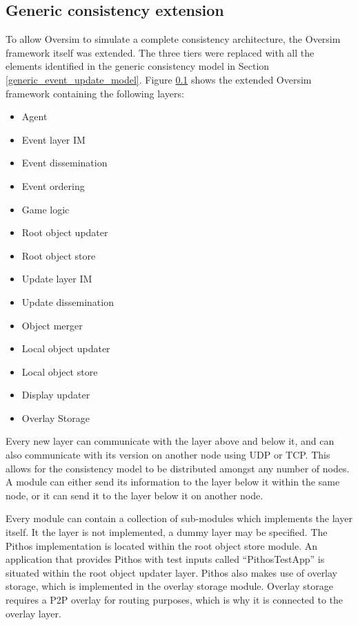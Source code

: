     \subsection{Generic consistency extension}


To allow Oversim to simulate a complete consistency architecture, the Oversim framework itself was extended. The three tiers were replaced with all the elements identified in the generic consistency model in Section \ref{generic_event_update_model}. Figure \ref{} shows the extended Oversim framework containing the following layers:
\begin{itemize}
    \item Agent
    \item Event layer IM
    \item Event dissemination
    \item Event ordering
    \item Game logic
    \item Root object updater
    \item Root object store
    \item Update layer IM
    \item Update dissemination
    \item Object merger
    \item Local object updater
    \item Local object store
    \item Display updater
    \item Overlay Storage
\end{itemize}

Every new layer can communicate with the layer above and below it, and can also communicate with its version on another node using UDP or TCP. This allows for the consistency model to be distributed amongst any number of nodes. A module can either send its information to the layer below it within the same node, or it can send it to the layer below it on another node.

Every module can contain a collection of sub-modules which implements the layer itself. It the layer is not implemented, a dummy layer may be specified. The Pithos implementation is located within the root object store module. An application that provides Pithos with test inputs called ``PithosTestApp'' is situated within the root object updater layer. Pithos also makes use of overlay storage, which is implemented in the overlay storage module. Overlay storage requires a P2P overlay for routing purposes, which is why it is connected to the overlay layer.


